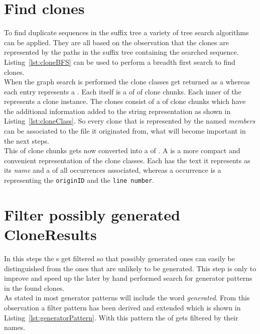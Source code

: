 \section{Find clones}
To find duplicate sequences in the suffix tree a variety of tree search algorithms can be applied. They are all based on the observation that the clones are represented by the paths in the suffix tree containing the searched sequence. Listing~\ref{lst:cloneBFS} can be used to perform a breadth first search to find clones.\\
When the graph search is performed the clone classes get returned as a  whereas each entry represents a . Each  itself is a  of  of clone chunks. Each inner  of the  represents a clone instance. The clones consist of a  of clone chunks which have the additional information added to the string representation as shown in Listing~\ref{lst:cloneClass}. So every clone that is represented by the  named \textit{members} can be associated to the file it originated from, what will become important in the next steps.\\
This  of clone chunks gets now converted into a  of . A  is a more compact and convenient representation of the clone classes. Each has the text it represents as its \textit{name} and a  of all occurrences associated, whereas a occurrence is a  representing the \texttt{originID} and the \texttt{line number}. 




\section{Filter possibly generated CloneResults}
In this steps the s get filtered so that possibly generated ones can easily be distinguished from the ones that are unlikely to be generated. This step is only to improve and speed up the later by hand performed search for generator patterns in the found clones.\\
As stated in \cite{Bernwieser2014} most generator patterns will include the word \textit{generated}. From this observation a filter pattern has been derived and extended which is shown in Listing~\ref{lst:generatorPattern}. With this pattern the  of  gets filtered by their names.


